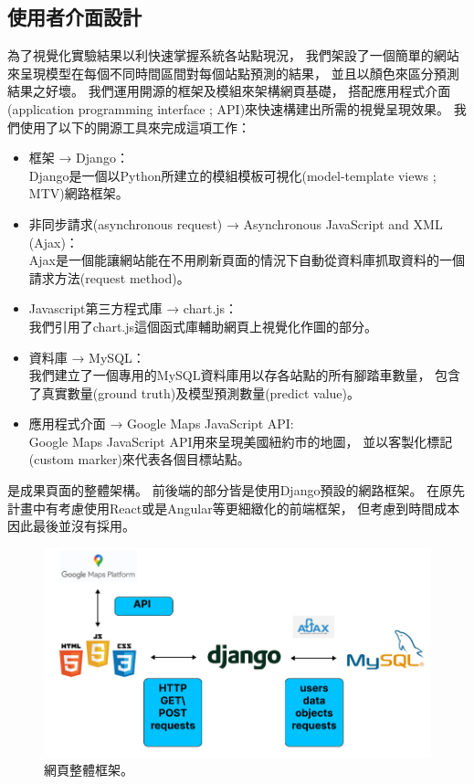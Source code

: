 \documentclass[a4paper,14pt]{extarticle}
\begin{document}
        \subsection{使用者介面設計}
            為了視覺化實驗結果以利快速掌握系統各站點現況，
            我們架設了一個簡單的網站來呈現模型在每個不同時間區間對每個站點預測的結果，
            並且以顏色來區分預測結果之好壞。
            我們運用開源的框架及模組來架構網頁基礎，
            搭配應用程式介面(application programming interface ; API)來快速構建出所需的視覺呈現效果。
            我們使用了以下的開源工具來完成這項工作：
            \begin{itemize}
                \item 框架 → Django： \\
                    Django是一個以Python所建立的模組模板可視化(model-template views ; MTV)網路框架。
                \item 非同步請求(asynchronous request) → Asynchronous JavaScript and XML (Ajax)： \\
                    Ajax是一個能讓網站能在不用刷新頁面的情況下自動從資料庫抓取資料的一個請求方法(request method)。
                \item Javascript第三方程式庫 → chart.js： \\
                    我們引用了chart.js這個函式庫輔助網頁上視覺化作圖的部分。
                \item 資料庫 → MySQL： \\
                    我們建立了一個專用的MySQL資料庫用以存各站點的所有腳踏車數量，
                    包含了真實數量(ground truth)及模型預測數量(predict value)。
                \item 應用程式介面 → Google Maps JavaScript API: \\
                    Google Maps JavaScript API用來呈現美國紐約市的地圖，
                    並以客製化標記(custom marker)來代表各個目標站點。
            \end{itemize}

            是成果頁面的整體架構。
            前後端的部分皆是使用Django預設的網路框架。
            在原先計畫中有考慮使用React或是Angular等更細緻化的前端框架，
            但考慮到時間成本因此最後並沒有採用。
            \begin{figure}[htbp]
                \centering
                \includegraphics[width=\textwidth]{webpage.png}
                \caption{
                    網頁整體框架。
                }
                \label{fig:webpage}
            \end{figure}
\end{document}
